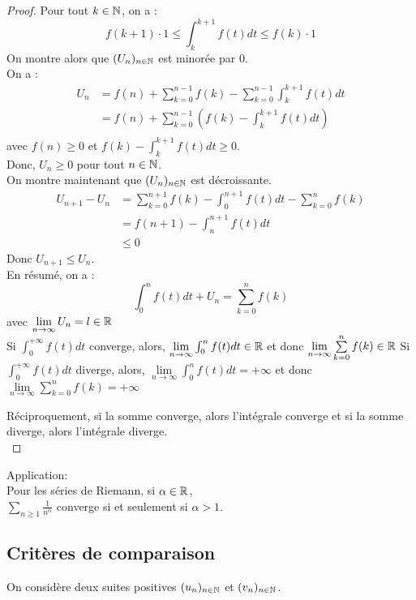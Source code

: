 \documentclass[../main.tex]{subfile}
\begin{document}
\begin{proof}
	Pour tout $k \in \mathbb{N}$, on a :
	$$f(k+1) \cdot 1 \leq \int_k^{k+1} f(t) dt \leq f(k) \cdot 1$$
	On montre alors que $(U_n)_{n \in \mathbb{N}}$ est minorée par $0$.\\
	On a :
	$$
\begin{aligned}
	U_n &= f(n) + \sum\limits_{k = 0}^{n-1} f(k) - \sum\limits_{k=0}^{n-1} \int_{k}^{k+1} f(t) dt\\
	&= f(n) + \sum\limits_{k = 0}^{n-1} (f(k) - \int_{k}^{k+1} f(t) dt)\\
\end{aligned}
	$$
	avec $f(n) \geq 0$ et $f(k) - \int_k^{k+1} f(t)dt \geq 0$.\\
	Donc, $U_n \geq 0$ pour tout $n \in \mathbb{N}$.\\
	On montre maintenant que $(U_n)_{n \in \mathbb{N}}$ est décroissante.\\
	$$
\begin{aligned}
	U_{n+1} - U_n &= \sum\limits_{k =0}^{n+1} f(k) - \int_0^{n+1} f(t)dt - \sum\limits_{k=0}^n f(k)\\
	&= f(n+1) - \int_n^{n+1} f(t)dt\\
	&\leq 0
\end{aligned}
	$$
	Donc $U_{n+1} \leq U_n$.\\

	En résumé, on a :
	$$\int_0^n f(t)dt + U_n = \sum\limits_{k=0}^n f(k)$$
	avec $\lim\limits_{n \to \infty} U_n = l \in \mathbb{R}$\\
	Si $\int_0^{+\infty} f(t)dt$ converge, alors, $\lim\limits_{n\to \infty} \int_0^n f(t)dt \in \mathbb{R}$ et donc $\lim\limits_{n \to \infty} \sum\limits_{k=0}^n f(k) \in \mathbb{R}$
	Si $\int_0^{+\infty} f(t)dt$ diverge, alors, $\lim\limits_{n\to \infty} \int_0^n f(t)dt = +\infty$ et donc $\lim\limits_{n \to \infty} \sum\limits_{k=0}^n f(k) = +\infty$

	Réciproquement, si la somme converge, alors l'intégrale converge et si la somme diverge, alors l'intégrale diverge.\\
\end{proof}

Application:\\
Pour les séries de Riemann, si $\alpha \in \mathbb{R}$, \\
$\sum\limits_{n \geq 1} \frac{1}{n^\alpha}$ converge si et seulement si $\alpha > 1$.\\



\subsection{Critères de comparaison}
On considère deux suites positives $(u_n)_{n\in \mathbb{N}}$ et $(v_n)_{n \in \mathbb{N}}$.\\
\end{document}
